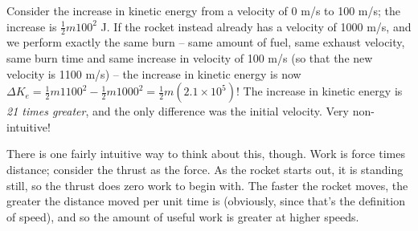 Consider the increase in kinetic energy from a velocity of 0 m/s to 100 m/s; the increase is $\frac{1}{2} m 100^2$ J. If the rocket instead already has a velocity of 1000 m/s, and we perform exactly the same burn -- same amount of fuel, same exhaust velocity, same burn time and same increase in velocity of 100 m/s (so that the new velocity is 1100 m/s) -- the increase in kinetic energy is now $\Delta K_e = \frac{1}{2} m 1100^2 - \frac{1}{2} m 1000^2 = \frac{1}{2} m (2.1 \times 10^5)$! The increase in kinetic energy is \emph{21 times greater}, and the only difference was the initial velocity. Very non-intuitive!

There is one fairly intuitive way to think about this, though. Work is force times distance; consider the thrust as the force. As the rocket starts out, it is standing still, so the thrust does zero work to begin with. The faster the rocket moves, the greater the distance moved per unit time is (obviously, since that's the definition of speed), and so the amount of useful work is greater at higher speeds.
